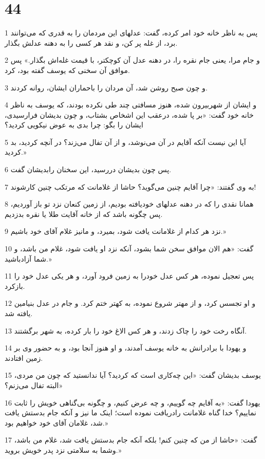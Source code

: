 \chapter{44}

\par 1 پس به ناظر خانه خود امر کرده، گفت: عدلهای این مردمان را به قدری که می‌توانند برد، از غله پر کن، و نقد هر کسی را به دهنه عدلش بگذار.
\par 2 و جام مرا، یعنی جام نقره را، در دهنه عدل آن کوچکتر، با قیمت غله‌اش بگذار.» پس موافق آن سخنی که یوسف گفته بود، کرد.
\par 3 و چون صبح روشن شد، آن مردان را باحماران ایشان، روانه کردند.
\par 4 و ایشان از شهربیرون شده، هنوز مسافتی چند طی نکرده بودند، که یوسف به ناظر خانه خود گفت: «بر پا شده، درعقب این اشخاص بشتاب، و چون بدیشان فرارسیدی، ایشان را بگو: چرا بدی به عوض نیکویی کردید؟
\par 5 آیا این نیست آنکه آقایم در آن می‌نوشد، و از آن تفال می‌زند؟ در آنچه کردید، بد کردید.»
\par 6 پس چون بدیشان در‌رسید، این سخنان رابدیشان گفت.
\par 7 به وی گفتند: «چرا آقایم چنین می‌گوید؟ حاشا از غلامانت که مرتکب چنین کارشوند!
\par 8 همانا نقدی را که در دهنه عدلهای خودیافته بودیم، از زمین کنعان نزد تو باز آوردیم، پس چگونه باشد که از خانه آقایت طلا یا نقره بدزدیم.
\par 9 نزد هر کدام از غلامانت یافت شود، بمیرد، و مانیز غلام آقای خود باشیم.»
\par 10 گفت: «هم الان موافق سخن شما بشود، آنکه نزد او یافت شود، غلام من باشد، و شما آزادباشید.»
\par 11 پس تعجیل نموده، هر کس عدل خودرا به زمین فرود آورد، و هر یکی عدل خود را بازکرد.
\par 12 و او تجسس کرد، و از مهتر شروع نموده، به کهتر ختم کرد. و جام در عدل بنیامین یافته شد.
\par 13 آنگاه رخت خود را چاک زدند، و هر کس الاغ خود را بار کرده، به شهر برگشتند.
\par 14 و یهودا با برادرانش به خانه یوسف آمدند، و او هنوز آنجا بود، و به حضور وی بر زمین افتادند.
\par 15 یوسف بدیشان گفت: «این چه‌کاری است که کردید؟ آیا ندانستید که چون من مردی، البته تفال می‌زنم؟»
\par 16 یهودا گفت: «به آقایم چه گوییم، و چه عرض کنیم، و چگونه بی‌گناهی خویش را ثابت نماییم؟ خدا گناه غلامانت رادریافت نموده است؛ اینک ما نیز و آنکه جام بدستش یافت شد، غلامان آقای خود خواهیم بود.»
\par 17 گفت: «حاشا از من که چنین کنم! بلکه آنکه جام بدستش یافت شد، غلام من باشد، وشما به سلامتی نزد پدر خویش بروید.»
